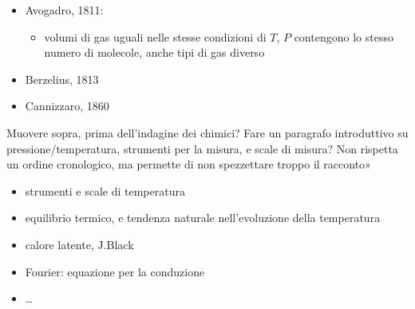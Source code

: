 \documentclass[letterpaper,10pt,italian]{jupyterBook}
\begin{document}
\begin{itemize}
\begin{itemize}
\end{itemize}

\item {} 
\sphinxAtStartPar
Avogadro, 1811:
\begin{itemize}
\item {} 
\sphinxAtStartPar
volumi di gas uguali nelle stesse condizioni di \(T\), \(P\) contengono lo stesso numero di molecole, anche tipi di gas diverso

\end{itemize}

\item {} 
\sphinxAtStartPar
Berzelius, 1813

\item {} 
\sphinxAtStartPar
Cannizzaro, 1860 

\end{itemize}

\sphinxAtStartPar
{} Muovere sopra, prima dell’indagine dei chimici? Fare un paragrafo introduttivo su pressione/temperatura, strumenti per la misura, e scale di misura? Non rispetta un ordine cronologico, ma permette di non spezzettare troppo il racconto»
\begin{itemize}
\item {} 
\sphinxAtStartPar
strumenti e scale di temperatura

\item {} 
\sphinxAtStartPar
equilibrio termico, e tendenza naturale nell’evoluzione della temperatura

\item {} 
\sphinxAtStartPar
calore latente, J.Black

\item {} 
\sphinxAtStartPar
Fourier: equazione per la conduzione

\item {} 
\sphinxAtStartPar
…

\end{itemize}
\end{document}

